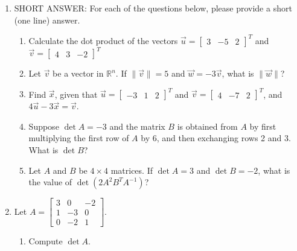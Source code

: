 \documentclass[12pt]{article}
\newcommand{\points}[1]{\marginpar{\hspace{24pt}[#1]}}
\newcommand{\R}{\mathbb{R}}
\newcommand{\len}[1]{\lVert #1\rVert}
\begin{document}
\begin{enumerate}
\item SHORT ANSWER: For each of the questions below, please provide a short (one line) answer.
 \begin{enumerate}


\item Calculate the dot product of the vectors $\vec{u}=\begin{bmatrix}3&-5&2\end{bmatrix}^T$ and $\vec{v} = \begin{bmatrix}4&3&-2\end{bmatrix}^T$ \points{2}

\vspace{1.2in}

\item Let $\vec{v}$ be a vector in $\R^n$. If $\len{\vec{v}}=5$ and $\vec{w} = -3\vec{v}$, what is $\len{\vec{w}}$? \points{2}

\vspace{1.2in}

\item Find $\vec{x}$, given that $\vec{u} = \begin{bmatrix}-3&1&2\end{bmatrix}^T$ and $\vec{v} = \begin{bmatrix}4&-7&2\end{bmatrix}^T$, and $4\vec{u}-3\vec{x}=\vec{v}$. \points{2}

\vspace{1.4in}

\item Suppose $\det A = -3$ and the matrix $B$ is obtained from $A$ by  \points{2} first multiplying the first row of $A$ by 6, and then exchanging rows 2 and 3. What is $\det B$?

\vspace{1.2in}

\item Let $A$ and $B$ be $4\times 4$ matrices. If $\det A=3$ and $\det B = -2$, what is the value of \points{2} $\det(2A^2B^TA^{-1})$?


\end{enumerate}
\newpage

\item Let $A = \begin{bmatrix}3&0&-2\\1&-3&0\\0&-2&1\end{bmatrix}$.
\begin{enumerate}
 \item Compute $\det A$. \points{5}


\end{enumerate}
\end{enumerate}
\end{document}
